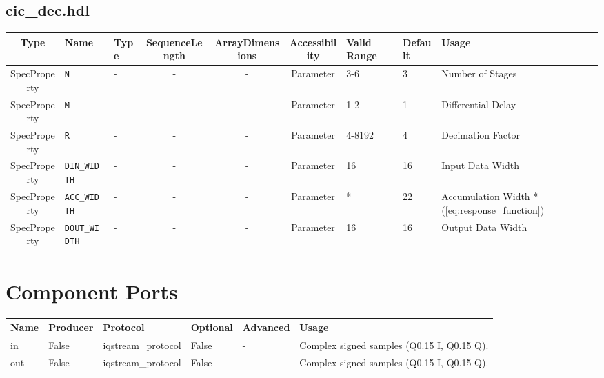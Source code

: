 \documentclass{article}
\def\comp{cic\_dec}
\begin{document}
\begin{landscape}
	\subsection*{\comp.hdl}
	\begin{scriptsize}
		\begin{tabular}{|c|p{2cm}|p{1cm}|c|c|c|p{2cm}|p{1cm}|p{5cm}|}
			\hline
			\rowcolor{blue}
			Type         & Name              & Type & SequenceLength & ArrayDimensions & Accessibility & Valid Range & Default & Usage                                            \\
			\hline
			SpecProperty & \verb+N+          & -    & -              & -               & Parameter     & 3-6         & 3       & Number of Stages                                 \\
			\hline
			SpecProperty & \verb+M+          & -    & -              & -               & Parameter     & 1-2         & 1       & Differential Delay                               \\
			\hline
			SpecProperty & \verb+R+          & -    & -              & -               & Parameter     & 4-8192      & 4       & Decimation Factor                                \\
			\hline
			SpecProperty & \verb+DIN_WIDTH+  & -    & -              & -               & Parameter     & 16          & 16      & Input Data Width                                 \\
			\hline
			SpecProperty & \verb+ACC_WIDTH+  & -    & -              & -               & Parameter     & *           & 22      & Accumulation Width *(\ref{eq:response_function}) \\
			\hline
			SpecProperty & \verb+DOUT_WIDTH+ & -    & -              & -               & Parameter     & 16          & 16      & Output Data Width                                \\
			\hline
		\end{tabular}
	\end{scriptsize}

	\section*{Component Ports}
	\begin{scriptsize}
		\begin{tabular}{|p{2cm}|p{1.5cm}|p{4cm}|p{1.5cm}|p{1.5cm}|p{10.75cm}|}
			\hline
			\rowcolor{blue}
			Name & Producer & Protocol           & Optional & Advanced & Usage                  \\
			\hline
			in   & False    & iqstream\_protocol & False     & -        & Complex signed samples (Q0.15 I, Q0.15 Q). \\
			\hline
			out  & False    & iqstream\_protocol & False     & -        & Complex signed samples (Q0.15 I, Q0.15 Q). \\
			\hline
		\end{tabular}
	\end{scriptsize}


\end{landscape}
\end{document}
